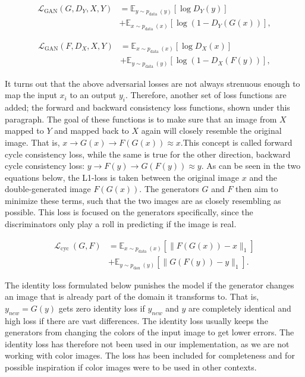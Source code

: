 \documentclass[12pt, fleqn, titlepage]{article}
\begin{document}
\[\begin{aligned}
	\mathcal{L}_{\mathrm{GAN}}\left(G, D_{Y}, X, Y\right) &=\mathbb{E}_{y \sim p_{\text {data }}(y)}\left[\log D_{Y}(y)\right] \\
	&+\mathbb{E}_{x \sim p_{\text {data }}(x)}\left[\log \left(1-D_{Y}(G(x))\right],\right.
\end{aligned}\]

\[\begin{aligned}
	\mathcal{L}_{\mathrm{GAN}}\left(F, D_{X}, X, Y\right) &=\mathbb{E}_{x \sim p_{\text {data }}(x)}\left[\log D_{X}(x)\right] \\
	&+\mathbb{E}_{y \sim p_{\text {data }}(y)}\left[\log \left(1-D_{X}(F(y))\right],\right.
\end{aligned}\]

It turns out that the above adversarial losses are not always strenuous enough to map the input $x_i$ to an output $y_i$. Therefore, another set of loss functions are added; the forward and backward consistency loss functions, shown under this paragraph. The goal of these functions is to make sure that an image from $X$ mapped to $Y$ and mapped back to $X$ again will closely resemble the original image. That is, $x \rightarrow G(x) \rightarrow F(G(x)) \approx x$.This concept is called forward cycle consistency loss, while the same is true for the other direction, backward cycle consistency loss: $y \rightarrow F(y) \rightarrow G(F(y)) \approx y$. As can be seen in the two equations below, the L1-loss is taken between the original image $x$ and the double-generated image $F(G(x))$. The generators $G$ and $F$ then aim to minimize these terms, such that the two images are as closely resembling as possible. This loss is focused on the generators specifically, since the discriminators only play a roll in predicting if the image is real.

\[\begin{aligned}
	\mathcal{L}_{\text {cyc }}(G, F) &=\mathbb{E}_{x \sim p_{\text {data }}(x)}\left[\|F(G(x))-x\|_{1}\right] \\
	&+\mathbb{E}_{y \sim p_{\text {dau }}(y)}\left[\|G(F(y))-y\|_{1}\right] .
\end{aligned}\]

The identity loss formulated below punishes the model if the generator changes an image that is already part of the domain it transforms to. That is, $y_{new} = G(y)$ gets zero identity loss if $y_{new}$ and $y$ are completely identical and high loss if there are vast differences. The identity loss usually keeps the generators from changing the colors of the input image to get lower errors. The identity loss has therefore not been used in our implementation, as we are not working with color images. The loss has been included for completeness and for possible inspiration if color images were to be used in other contexts.
\end{document}

